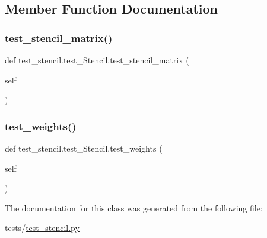 \subsection{Member Function Documentation}
\mbox{\label{classtest__stencil_1_1test__Stencil_a9f77e568b5ace9bb494e3a5725305d9c}} 
\subsubsection{\texorpdfstring{test\+\_\+stencil\+\_\+matrix()}{test\_stencil\_matrix()}}
{\footnotesize\ttfamily def test\+\_\+stencil.\+test\+\_\+\+Stencil.\+test\+\_\+stencil\+\_\+matrix (\begin{DoxyParamCaption}\item[{}]{self }\end{DoxyParamCaption})}

\mbox{\label{classtest__stencil_1_1test__Stencil_af1151663d21ad230396accaa1904c62c}} 
\subsubsection{\texorpdfstring{test\+\_\+weights()}{test\_weights()}}
{\footnotesize\ttfamily def test\+\_\+stencil.\+test\+\_\+\+Stencil.\+test\+\_\+weights (\begin{DoxyParamCaption}\item[{}]{self }\end{DoxyParamCaption})}



The documentation for this class was generated from the following file\+:\begin{DoxyCompactItemize}
\item 
tests/\hyperlink{test__stencil_8py}{test\+\_\+stencil.\+py}\end{DoxyCompactItemize}
